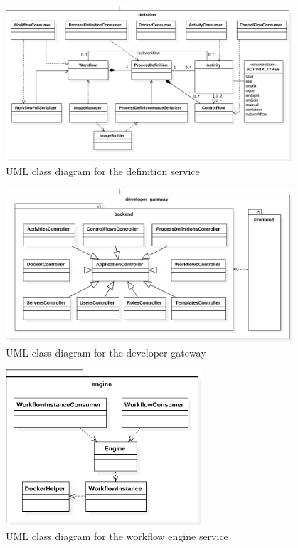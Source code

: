   \begin{figure}[htbp]
    \centering
    \includegraphics[width=0.95\textwidth]{content/images/class_diagram_definition-crop.pdf}
    \caption{UML class diagram for the definition service}
    \label{fig:class_diagram_definition}
  \end{figure}

  \begin{figure}[htbp]
    \centering
    \includegraphics[width=0.95\textwidth]{content/images/class_diagram_developer_gateway-crop.pdf}
    \caption{UML class diagram for the developer gateway}
    \label{fig:class_diagram_developer_gateway}
  \end{figure}

  \begin{figure}[htbp]
    \centering
    \includegraphics[width=0.65\textwidth]{content/images/class_diagram_engine-crop.pdf}
    \caption{UML class diagram for the workflow engine service}
    \label{fig:class_diagram_engine}
  \end{figure}


